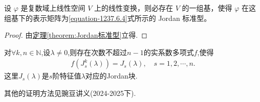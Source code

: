 \documentclass[../../main.tex]{subfiles}%
\begin{document}
\begin{theorem}\label{theorem:线性变换一定有一个Jordan矩阵作为其表示矩阵}
设 $\varphi$ 是复数域上线性空间 $V$ 上的线性变换，则必存在 $V$ 的一组基，使得 $\varphi$ 在这组基下的表示矩阵为\eqref{equation-1237.6.4}式所示的 Jordan 标准型。
\end{theorem}
\begin{proof}
由\hyperref[theorem:Jordan标准型]{定理\ref{theorem:Jordan标准型}}立得.
\end{proof}

\begin{proposition}\label{proposition:特征值为1的Jordan块可由其k次幂的多项式表示}
对$\forall k,n\in \mathbb{N}$,设$\lambda \neq 0$,则存在次数不超过$n-1$的实系数多项式$f$,使得
\begin{align}\label{eq::28947234n9jf0wej0}
f\left( J_{s}^{k}(\lambda) \right) =J_s(\lambda),\quad s=1,2,\cdots ,n.
\end{align}
这里$J_s(\lambda)$是$s$阶特征值$\lambda$对应的Jordan块.
\end{proposition}
\begin{note}
其他的证明方法见豌豆讲义(2024-2025下).
\end{note}
\end{document}

